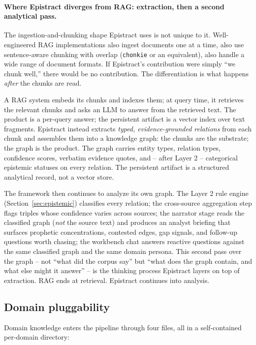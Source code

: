 \paragraph{Where Epistract diverges from RAG: extraction, then a second analytical pass.} The ingestion-and-chunking shape Epistract uses is not unique to it. Well-engineered RAG implementations also ingest documents one at a time, also use sentence-aware chunking with overlap (\texttt{chonkie} or an equivalent), also handle a wide range of document formats. If Epistract's contribution were simply ``we chunk well,'' there would be no contribution. The differentiation is what happens \emph{after} the chunks are read.

A RAG system embeds its chunks and indexes them; at query time, it retrieves the relevant chunks and asks an LLM to answer from the retrieved text. The product is a per-query answer; the persistent artifact is a vector index over text fragments. Epistract instead extracts \emph{typed, evidence-grounded relations} from each chunk and assembles them into a knowledge graph: the chunks are the substrate; the graph is the product. The graph carries entity types, relation types, confidence scores, verbatim evidence quotes, and -- after Layer 2 -- categorical epistemic statuses on every relation. The persistent artifact is a structured analytical record, not a vector store.

The framework then continues to analyze its own graph. The Layer 2 rule engine (Section~\ref{sec:epistemic}) classifies every relation; the cross-source aggregation step flags triples whose confidence varies across sources; the narrator stage reads the classified graph (\emph{not} the source text) and produces an analyst briefing that surfaces prophetic concentrations, contested edges, gap signals, and follow-up questions worth chasing; the workbench chat answers reactive questions against the same classified graph and the same domain persona. This second pass over the graph -- not ``what did the corpus say'' but ``what does the graph contain, and what else might it answer'' -- is the thinking process Epistract layers on top of extraction. RAG ends at retrieval. Epistract continues into analysis.

\subsection{Domain pluggability}

Domain knowledge enters the pipeline through four files, all in a self-contained per-domain directory:

